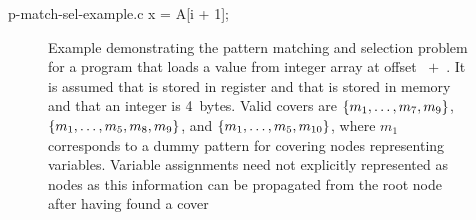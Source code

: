 \begin{filecontents*}{p-match-sel-example.c}
x = A[i + 1];
\end{filecontents*}

\begin{figure}
  \centering%
                {%
                  \begin{lstpage}{2.6cm}%
                  \end{lstpage}%
                }%
  \hfill%
  \hfill%

  \caption[Example of the pattern matching and selection problem]%
          {%
            Example demonstrating the pattern matching and selection problem for
            a program that loads a value from integer array  at offset
            \mbox{ $+$ }.
            It is assumed that  is
            stored in register and that  is stored in memory and that
            an integer is 4~bytes.
            Valid covers are \mbox{$\mSet{m_1, \ldots, m_7, m_9}$},
            \mbox{$\mSet{m_1, \ldots, m_5, m_8, m_9}$}, and
            \mbox{$\mSet{m_1, \ldots, m_5, m_{10}}$}, where $m_1$ corresponds to
            a dummy pattern for covering nodes representing variables.
            Variable assignments need not explicitly represented as nodes as
            this information can be propagated from the root node after having
            found a cover%
          }
\end{figure}

